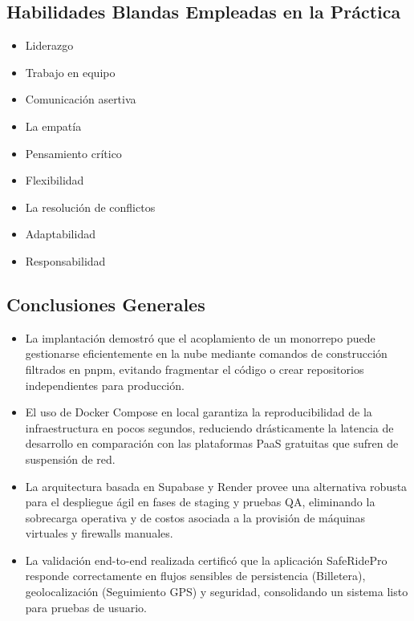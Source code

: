 \documentclass{article}
\newcommand{\checkedbox}{\stackinset{c}{0pt}{c}{0pt}{\checkmark}{$\square$}}
\begin{document}
\subsection{Habilidades Blandas Empleadas en la Práctica}
\begin{itemize}
    \item[$\square$] Liderazgo
    \item[\checkedbox] Trabajo en equipo
    \item[$\square$] Comunicación asertiva
    \item[$\square$] La empatía
    \item[\checkedbox] Pensamiento crítico
    \item[$\square$] Flexibilidad
    \item[$\square$] La resolución de conflictos
    \item[$\square$] Adaptabilidad
    \item[\checkedbox] Responsabilidad
\end{itemize}

\subsection{Conclusiones Generales}
\begin{itemize}[leftmargin=*,noitemsep]
    \item La implantación demostró que el acoplamiento de un monorrepo puede gestionarse eficientemente en la nube mediante comandos de construcción filtrados en pnpm, evitando fragmentar el código o crear repositorios independientes para producción.
    \item El uso de Docker Compose en local garantiza la reproducibilidad de la infraestructura en pocos segundos, reduciendo drásticamente la latencia de desarrollo en comparación con las plataformas PaaS gratuitas que sufren de suspensión de red.
    \item La arquitectura basada en Supabase y Render provee una alternativa robusta para el despliegue ágil en fases de staging y pruebas QA, eliminando la sobrecarga operativa y de costos asociada a la provisión de máquinas virtuales y firewalls manuales.
    \item La validación end-to-end realizada certificó que la aplicación SafeRidePro responde correctamente en flujos sensibles de persistencia (Billetera), geolocalización (Seguimiento GPS) y seguridad, consolidando un sistema listo para pruebas de usuario.
\end{itemize}
\end{document}
